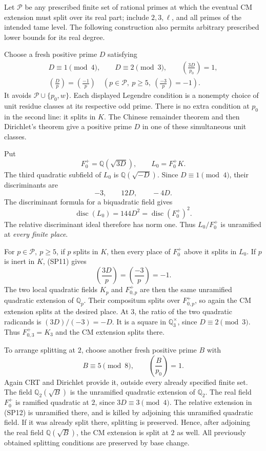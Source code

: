 Let \(\mathcal P\) be any prescribed finite set of rational
primes at which the eventual CM extension must split
over its real part; include \(2,3,\ell\), and all primes
of the intended tame level.
The following construction also permits arbitrary prescribed
lower bounds for its real degree.

Choose a fresh positive prime \(D\) satisfying
\[
 \begin{gathered}
 D\equiv1\pmod4,\qquad D\equiv2\pmod3,\qquad
                      \left(\frac{3D}{p_0}\right)=1,\\
 \left(\frac Dp\right)=\left(\frac{-1}p\right)
 \quad\left(p\in\mathcal P,\ p\ge5,\
                     \left(\frac{-3}p\right)=-1\right).
 \end{gathered}
 \tag{SP11}
\]
It avoids \(\mathcal P\cup\{p_0,w\}\).
Each displayed Legendre condition is a nonempty choice of
unit residue classes at its respective odd prime.
There is no extra condition at \(p_0\) in the second line:
it splits in \(K\).
The Chinese remainder theorem and then Dirichlet's theorem
give a positive prime \(D\) in one of these simultaneous
unit classes.

Put
\[
            F_0^+=\mathbb Q(\sqrt{3D}),\qquad
                     L_0=F_0^+K.
\]
The third quadratic subfield of \(L_0\) is
\(\mathbb Q(\sqrt{-D})\).
Since \(D\equiv1\pmod4\), their discriminants are
\[
       -3,\qquad 12D,\qquad-4D .
\]
The discriminant formula for a biquadratic field gives
\[
        \operatorname{disc}(L_0)=144D^2
                          =\operatorname{disc}(F_0^+)^2 .
 \tag{SP12}
\]
The relative discriminant ideal therefore has norm one.
Thus \(L_0/F_0^+\) is unramified at \emph{every finite place}.

For \(p\in\mathcal P,\ p\ge5\), if \(p\) splits in \(K\),
then every place of \(F_0^+\) above it splits in \(L_0\).
If \(p\) is inert in \(K\), (SP11) gives
\[
                 \left(\frac{3D}p\right)
                    =\left(\frac{-3}p\right)=-1 .
\]
The two local quadratic fields \(K_p\) and \(F_{0,p}^+\)
are then the same unramified quadratic extension of
\(\mathbb Q_p\).
Their compositum splits over \(F_{0,p}^+\), so again the
CM extension splits at the desired place.
At \(3\), the ratio of the two quadratic radicands is
\((3D)/(-3)=-D\).
It is a square in \(\mathbb Q_3^\times\), since
\(D\equiv2\pmod3\).
Thus \(F_{0,3}^+=K_3\) and the CM extension splits there.

To arrange splitting at \(2\), choose another fresh positive
prime \(B\) with
\[
                      B\equiv5\pmod8,\qquad
                           \left(\frac B{p_0}\right)=1 .
 \tag{SP13}
\]
Again CRT and Dirichlet provide it, outside every already
specified finite set.
The field \(\mathbb Q_2(\sqrt B)\) is the unramified
quadratic extension of \(\mathbb Q_2\).
The real field \(F_0^+\) is ramified quadratic at \(2\),
since \(3D\equiv3\pmod4\).
The relative extension in (SP12) is unramified there,
and is killed by adjoining this unramified quadratic
field.  If it was already split there, splitting is
preserved.
Hence, after adjoining the real field \(\mathbb Q(\sqrt B)\),
the CM extension is split at \(2\) as well.
All previously obtained splitting conditions are preserved
by base change.

